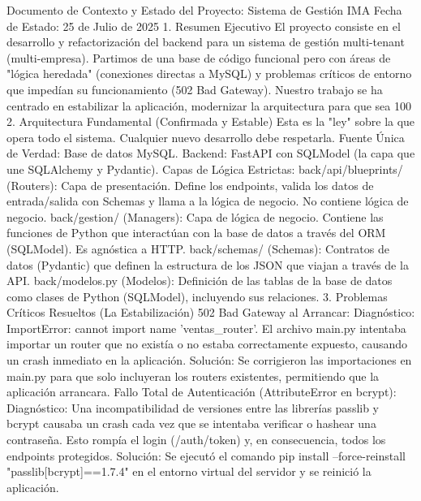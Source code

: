 Documento de Contexto y Estado del Proyecto: Sistema de Gestión IMA
Fecha de Estado: 25 de Julio de 2025
1. Resumen Ejecutivo
El proyecto consiste en el desarrollo y refactorización del backend para un sistema de gestión multi-tenant (multi-empresa). Partimos de una base de código funcional pero con áreas de "lógica heredada" (conexiones directas a MySQL) y problemas críticos de entorno que impedían su funcionamiento (502 Bad Gateway). Nuestro trabajo se ha centrado en estabilizar la aplicación, modernizar la arquitectura para que sea 100%
2. Arquitectura Fundamental (Confirmada y Estable)
Esta es la "ley" sobre la que opera todo el sistema. Cualquier nuevo desarrollo debe respetarla.
Fuente Única de Verdad: Base de datos MySQL.
Backend: FastAPI con SQLModel (la capa que une SQLAlchemy y Pydantic).
Capas de Lógica Estrictas:
back/api/blueprints/ (Routers): Capa de presentación. Define los endpoints, valida los datos de entrada/salida con Schemas y llama a la lógica de negocio. No contiene lógica de negocio.
back/gestion/ (Managers): Capa de lógica de negocio. Contiene las funciones de Python que interactúan con la base de datos a través del ORM (SQLModel). Es agnóstica a HTTP.
back/schemas/ (Schemas): Contratos de datos (Pydantic) que definen la estructura de los JSON que viajan a través de la API.
back/modelos.py (Modelos): Definición de las tablas de la base de datos como clases de Python (SQLModel), incluyendo sus relaciones.
3. Problemas Críticos Resueltos (La Estabilización)
502 Bad Gateway al Arrancar:
Diagnóstico: ImportError: cannot import name 'ventas_router'. El archivo main.py intentaba importar un router que no existía o no estaba correctamente expuesto, causando un crash inmediato en la aplicación.
Solución: Se corrigieron las importaciones en main.py para que solo incluyeran los routers existentes, permitiendo que la aplicación arrancara.
Fallo Total de Autenticación (AttributeError en bcrypt):
Diagnóstico: Una incompatibilidad de versiones entre las librerías passlib y bcrypt causaba un crash cada vez que se intentaba verificar o hashear una contraseña. Esto rompía el login (/auth/token) y, en consecuencia, todos los endpoints protegidos.
Solución: Se ejecutó el comando pip install --force-reinstall "passlib[bcrypt]==1.7.4" en el entorno virtual del servidor y se reinició la aplicación.
